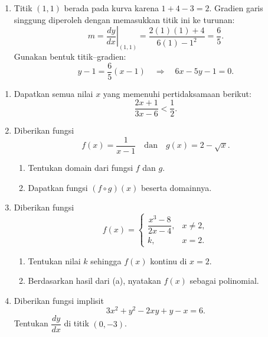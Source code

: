 \documentclass[10pt,letterpaper]{article}
\begin{document}
\begin{enumerate}
\begin{enumerate}
          \item Titik $(1,1)$ berada pada kurva karena $1+4-3=2$.
                Gradien garis singgung diperoleh dengan memasukkan titik ini ke turunan:
                \[
                  m=\left.\frac{dy}{dx}\right|_{(1,1)}
                  =\frac{2(1)(1)+4}{6(1)-1^2}=\frac65.
                \]
                Gunakan bentuk titik--gradien:
                \[
                  y-1=\frac65(x-1)
                  \quad\Longrightarrow\quad\boxed{6x-5y-1=0}.
                \]
        \end{enumerate}

\end{enumerate}
\par\endgroup

\newpage

\begin{enumerate}

  \item Dapatkan semua nilai $x$ yang memenuhi pertidaksamaan berikut:
        \[
          \frac{2x+1}{3x-6}<\frac12.
        \]

  \item Diberikan fungsi
        \[
          f(x)=\frac1{x-1}\quad\text{dan}\quad g(x)=2-\sqrt{x}.
        \]
        \begin{enumerate}
          \item Tentukan domain dari fungsi $f$ dan $g$.
          \item Dapatkan fungsi $(f\circ g)(x)$ beserta domainnya.
        \end{enumerate}

  \item Diberikan fungsi
        \[
          f(x)=
          \begin{cases}
            \dfrac{x^3-8}{2x-4}, & x\ne2, \\[5pt]
            k,                   & x=2.
          \end{cases}
        \]
        \begin{enumerate}
          \item Tentukan nilai $k$ sehingga $f(x)$ kontinu di $x=2$.
          \item Berdasarkan hasil dari (a), nyatakan $f(x)$ sebagai polinomial.
        \end{enumerate}

  \item Diberikan fungsi implisit
        \[
          3x^2+y^2-2xy+y-x=6.
        \]
        Tentukan $\dfrac{dy}{dx}$ di titik $(0,-3)$.


\end{enumerate}
\end{document}
